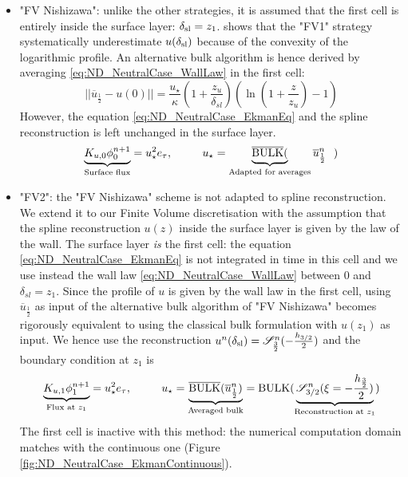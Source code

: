 \begin{itemize}
    \item "FV Nishizawa":  unlike the other strategies,
	    it is assumed that the first cell is entirely inside
		the surface layer: $\delta_{\rm sl} = z_{1}$.
		\cite{nishizawa_surface_2018} shows that the "FV1"
		strategy systematically underestimate
		$u(\delta_{\rm sl})$ because of the
	  convexity of the logarithmic profile.
	  An alternative bulk algorithm is hence derived by averaging
		\eqref{eq:ND_NeutralCase_WallLaw} in the first cell:
	\begin{equation}
		||\overline{u}_{\frac{1}{2}} - u(0)||
		= \frac{u_\star}{\kappa}
		\left(1+\frac{z_u}{\delta_{sl}}\right)
		\left(\ln(1+\frac{z}{z_u})-1\right)
	\end{equation}
	However, the equation \eqref{eq:ND_NeutralCase_EkmanEq}
	and the spline reconstruction is left unchanged in the
	surface layer.
		  \begin{equation}
		\underbrace{K_{u,0} \phi_0^{n+1}}_{\text{Surface flux}}
		= u_\star^2 e_\tau, ~~~~~~~~
			  u_\star = \underbrace{\overline{{\rm BULK}}(}_{
				  \text{Adapted for averages}}
			  \overline{u}^{n}_{\frac{1}{2}}~~)
		  \end{equation}
	\item "FV2": the "FV Nishizawa" scheme is not adapted to
		spline reconstruction. We extend it to our
		Finite Volume discretisation with the assumption
		that the spline reconstruction $u(z)$ inside
		the surface layer is given by the law of the wall.
	    The surface layer \textit{is} the first cell:
	    the equation \eqref{eq:ND_NeutralCase_EkmanEq}
	    is not integrated in time in this cell
	and we use instead the wall law
	\eqref{eq:ND_NeutralCase_WallLaw} between 0 and
		$\delta_{sl} = z_1$.
	Since the profile of $u$ is given by the wall law
	in the first cell,
	using $\overline{u}_{\frac{1}{2}}$ as input of
	the alternative bulk algorithm of "FV Nishizawa"
	becomes rigorously equivalent to using the
	classical bulk formulation with $u(z_1)$
	as input.
	We hence use the reconstruction
	$u^n(\delta_{\rm sl}) = {\cal S}^n_{\frac{3}{2}}(
	  -\frac{h_{3/2}}{2})$ and the boundary condition
		  at $z_1$ is
	  \begin{equation}
		\underbrace{K_{u,1} \phi_1^{n+1}}_{\text{Flux at } z_1}
		= u_\star^2 e_\tau, ~~~~~~~~
			  u_\star = \underbrace{\overline{{\rm BULK}}(
			  \overline{u}^{n}_{\frac{1}{2}})}_{
				  \text{Averaged bulk}
			  } = {\rm BULK}(
			\underbrace{{\cal S}_{3/2}^{n}
			(\xi=-\frac{h_{\frac{3}{2}}}{2})}_{
				\text{Reconstruction at }
			z_{1}})
		  \end{equation}
	The first cell is inactive with this method:
	the numerical computation domain matches with the continuous
	one (Figure \ref{fig:ND_NeutralCase_EkmanContinuous}).
  \end{itemize}

